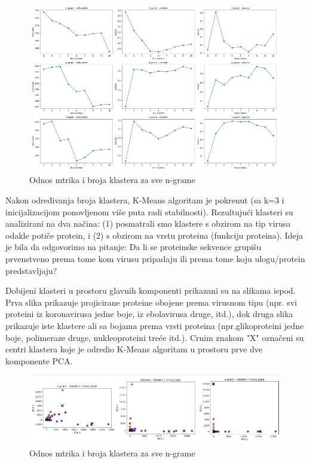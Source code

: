 \documentclass[a4paper,12pt]{article}
\begin{document}
\begin{figure}[H]
    \centering
    \includegraphics[width=1.2\textwidth]{images/km_met.png}
    \caption{Odnos mtrika i broja klastera za sve n-grame}
    \label{fig:km_met}
\end{figure}

\noindent
\begin{minipage}{\textwidth}
Nakon određivanja broja klastera, K-Means algoritam je pokrenut (sa k=3 i inicijalizacijom ponovljenom više puta radi stabilnosti). Rezultujući klasteri su analizirani na dva načina: (1) posmatrali smo klastere s obzirom na tip virusa odakle potiče protein, i (2) s obzirom na vrstu proteina (funkciju proteina). Ideja je bila da odgovorimo na pitanje: Da li se proteinske sekvence grupišu prvenstveno prema tome kom virusu pripadaju ili prema tome koju ulogu/protein predstavljaju?
\end{minipage}

\vspace{1cm}

\noindent
\begin{minipage}{\textwidth}
Dobijeni klasteri u prostoru glavnih komponenti prikazani su na slikama ispod. Prva slika prikazuje projicirane proteine obojene prema virusnom tipu (npr. svi proteini iz koronavirusa jedne boje, iz ebolavirusa druge, itd.), dok druga slika prikazuje iste klastere ali sa bojama prema vrsti proteina (npr.glikoproteini jedne boje, polimeraze druge, nukleoproteini treće itd.). Crnim znakom "X" označeni su centri klastera koje je odredio K-Means algoritam u prostoru prve dve komponente PCA.
\end{minipage}

\begin{figure}[H]
    \centering
    \includegraphics[width=1.2\textwidth]{images/km_virus.png}
    \caption{Odnos mtrika i broja klastera za sve n-grame}
    \label{fig:km_vir}
\end{figure}
\end{document}
